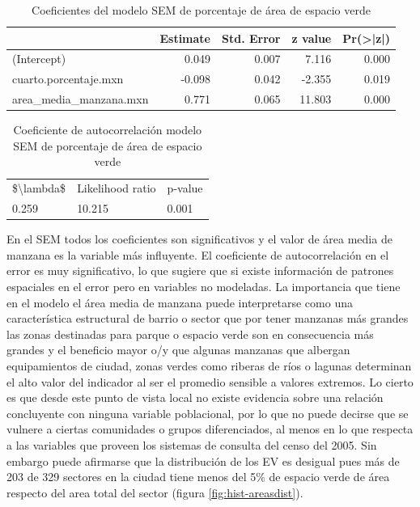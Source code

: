 \documentclass[12pt,]{book}
\begin{document}
\begin{table}

\caption{\label{tab:coef-sem-areaep}Coeficientes del modelo SEM de porcentaje de área de espacio verde}
\centering
\begin{tabular}[t]{lrrrr}
\toprule
  & Estimate & Std. Error & z value & Pr(>|z|)\\
\midrule
(Intercept) & 0.049 & 0.007 & 7.116 & 0.000\\
cuarto.porcentaje.mxn & -0.098 & 0.042 & -2.355 & 0.019\\
area\_media\_manzana.mxn & 0.771 & 0.065 & 11.803 & 0.000\\
\bottomrule
\end{tabular}
\end{table}\begin{table}

\caption{\label{tab:coef-lambda-areaep}Coeficiente de autocorrelación modelo SEM de porcentaje de área de espacio verde}
\centering
\begin{tabular}[t]{lll}
\toprule
\$\textbackslash{}lambda\$ & Likelihood ratio & p-value\\
0.259 & 10.215 & 0.001\\
\bottomrule
\end{tabular}
\end{table}

En el SEM todos los coeficientes son significativos y el valor de área
media de manzana es la variable más influyente. El coeficiente de
autocorrelación en el error es muy significativo, lo que sugiere que si
existe información de patrones espaciales en el error pero en variables
no modeladas. La importancia que tiene en el modelo el área media de
manzana puede interpretarse como una característica estructural de
barrio o sector que por tener manzanas más grandes las zonas destinadas
para parque o espacio verde son en consecuencia más grandes y el
beneficio mayor o/y que algunas manzanas que albergan equipamientos de
ciudad, zonas verdes como riberas de ríos o lagunas determinan el alto
valor del indicador al ser el promedio sensible a valores extremos. Lo
cierto es que desde este punto de vista local no existe evidencia sobre
una relación concluyente con ninguna variable poblacional, por lo que no
puede decirse que se vulnere a ciertas comunidades o grupos
diferenciados, al menos en lo que respecta a las variables que proveen
los sistemas de consulta del censo del 2005. Sin embargo puede afirmarse
que la distribución de los EV es desigual pues más de 203 de 329
sectores en la ciudad tiene menos del 5\% de espacio verde de área
respecto del area total del sector (figura \ref{fig:hist-areasdist}).
\end{document}
